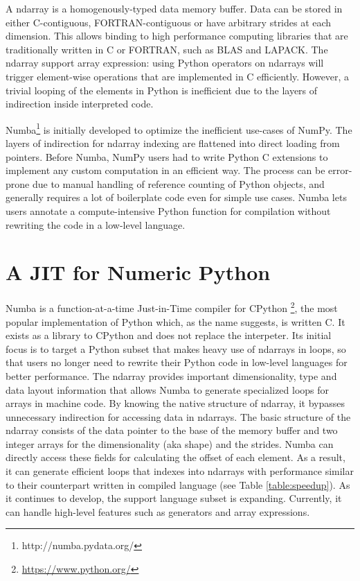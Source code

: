 \documentclass{acm_proc_article-sp}
\begin{document}
A ndarray is a homogenously-typed data memory buffer.  Data can be
stored in either C-contiguous, FORTRAN-contiguous or have arbitrary
strides at each dimension.  This allows binding to high performance
computing libraries that are traditionally written in C or FORTRAN,
such as BLAS and LAPACK. The ndarray support array expression: using
Python operators on ndarrays will trigger element-wise operations that
are implemented in C efficiently.  However, a trivial looping of the
elements in Python is inefficient due to the layers of indirection
inside interpreted code.

Numba\footnote{http://numba.pydata.org/} is initially developed to optimize
the inefficient use-cases of NumPy.
The layers of indirection for ndarray indexing are flattened into direct
loading from pointers.  Before Numba, NumPy users had to write Python
C extensions to implement any custom computation in an efficient way.
The process can be error-prone due to manual handling of reference counting
of Python objects, and generally requires a lot of boilerplate code even
for simple use cases.  Numba lets users annotate a compute-intensive Python
function for compilation without rewriting the code in a low-level language.

\section{A JIT for Numeric Python}

Numba is a function-at-a-time Just-in-Time compiler for CPython
\footnote{\url{https://www.python.org/}},
the most popular implementation of Python which,
as the name suggests, is written C.
It exists as a library to CPython and does not replace the interpeter.
Its initial focus is to target a Python subset that makes heavy use of
ndarrays in loops, so that users no longer need to rewrite their Python code in
low-level languages for better performance.
The ndarray provides important dimensionality, type and data layout information
that allows Numba to generate specialized  loops for arrays in machine code.
By knowing the native structure of ndarray,
it bypasses unnecessary indirection for accessing data in ndarrays.
The basic structure of the ndarray consists of the data pointer to the base of
the memory buffer and two integer arrays for the dimensionality (aka shape) and
the strides. Numba can directly access these fields for calculating the offset
of each element.  As a result, it can generate efficient loops that indexes
into ndarrays with performance similar to their counterpart written in compiled
language (see Table \ref{table:speedup}). As it continues to develop, the support language
subset is expanding. Currently, it can handle high-level features such as
generators and array expressions.
\end{document}
